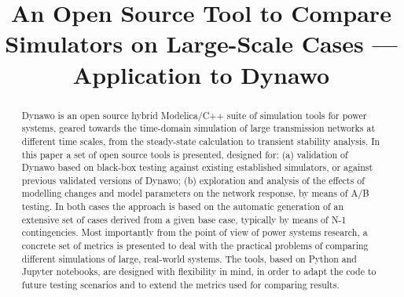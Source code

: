 \documentclass[conference]{IEEEtran}
\begin{document}

\title{An Open Source Tool to Compare Simulators on Large-Scale Cases
  --- Application to Dynawo}

\author{
}

\maketitle

\begin{abstract}
  Dynawo is an open source hybrid Modelica/C++ suite of simulation tools for
  power systems, geared towards the time-domain simulation of large transmission
  networks at different time scales, from the steady-state calculation to
  transient stability analysis. In this paper a set of open source
  tools is presented, designed for: (a) validation of Dynawo based on black-box testing
  against existing established simulators, or against previous validated
  versions of Dynawo; (b) exploration and analysis of the effects of modelling
  changes and model parameters on the network response, by means of A/B
  testing. In both cases the approach is based on the automatic generation of an
  extensive set of cases derived from a given base case, typically by means of
  N-1 contingencies. Most importantly from the point of view of power systems
  research, a concrete set of metrics is presented to deal with the
  practical problems of comparing different simulations of large, real-world
  systems. The tools, based on Python and Jupyter notebooks, are designed with
  flexibility in mind, in order to adapt the code to future testing scenarios
  and to extend the metrics used for comparing results.
\end{abstract}
\end{document}
